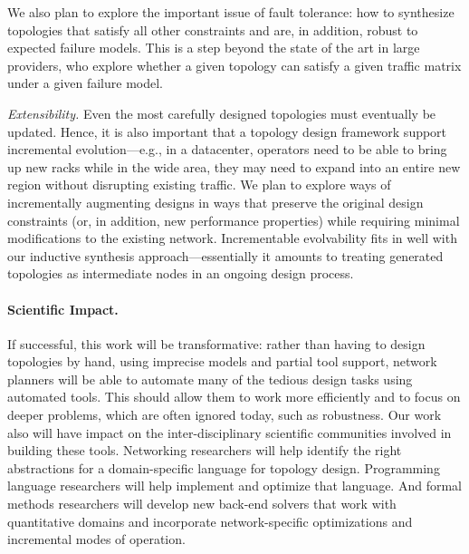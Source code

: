 We also plan to explore the important issue of fault tolerance: how to
synthesize topologies that satisfy all other constraints and are, in
addition, robust to expected failure models. This is a step beyond the
state of the art in large providers, who explore whether a given
topology can satisfy a given traffic matrix under a given failure
model.

\textit{Extensibility.}
%
Even the most carefully designed topologies must eventually be
updated. Hence, it is also important that a topology design framework
support incremental evolution---e.g., in a datacenter, operators need
to be able to bring up new racks while in the wide area, they may need
to expand into an entire new region without disrupting existing
traffic. We plan to explore ways of incrementally augmenting designs
in ways that preserve the original design constraints (or, in
addition, new performance properties) while requiring minimal
modifications to the existing network. Incrementable evolvability fits
in well with our inductive synthesis approach---essentially it amounts
to treating generated topologies as intermediate nodes in an ongoing
design process.

\paragraph*{Scientific Impact.}
%
If successful, this work will be transformative: rather than having to
design topologies by hand, using imprecise models and partial tool
support, network planners will be able to automate many of the tedious
design tasks using automated tools. This should allow them to work
more efficiently and to focus on deeper problems, which are often
ignored today, such as robustness. Our work also will have impact on
the inter-disciplinary scientific communities involved in building
these tools. Networking researchers will help identify the right
abstractions for a domain-specific language for topology
design. Programming language researchers will help implement and
optimize that language. And formal methods researchers will develop
new back-end solvers that work with quantitative domains and
incorporate network-specific optimizations and incremental modes of
operation.
\fi
